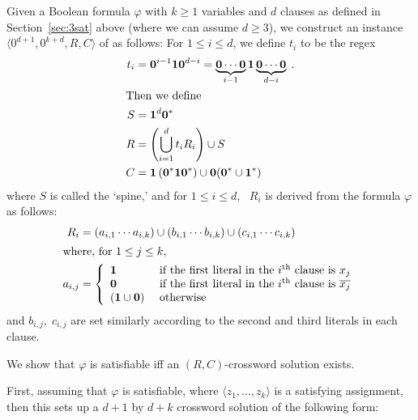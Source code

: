\documentclass{article}
\newcommand{\0}{\mathbf{0}}
\newcommand{\1}{\mathbf{1}}
\newcommand{\2}{\mathbf{2}}
\renewcommand{\p}{\varphi}
\newcommand{\tup}[1]{\langle{} #1 \rangle{}}
\theoremstyle{plain}
\theoremstyle{definition}
\begin{document}
Given a Boolean formula $\p$ with $k\ge 1$ variables and $d$ clauses as defined in Section~\ref{sec:3sat} above (where we can assume $d\ge 3$), we construct an instance $\tup{0^{d+1},0^{k+d},R,C}$ of  as follows: For $1 \le i \le d$, we define $t_i$ to be the regex
\begin{align*}
  t_i & = \0^{i-1}\1\0^{d-i} = \underbrace{\0 \cdots \0}_{i - 1} \1 \underbrace {\0 \cdots \0}_{d - i}\;. \\
  \shortintertext{Then we define}
  S   & = \1^d\0^*                                                                                        \\
  R   & = \left( \displaystyle \bigcup_{i=1}^{d} t_i R_i \right) \cup S                                   \\
  C   & = \1\left(\0^*\1\0^*\right) \cup \0(\0^* \cup \1^*)
\end{align*}
where $S$ is called the `spine,' and for $1\le i\le d$, \ $R_i$ is derived from the formula $\p$ as follows:
\begin{align*}
  R_i                                                  & = (a_{i,1} \cdots a_{i,k}) \cup (b_{i,1} \cdots b_{i,k}) \cup (c_{i,1} \cdots c_{i,k}) \\
  \shortintertext{where, for $1 \le j \le k$,} a_{i,j} & = \left\{
  \begin{array}{ll}
    \1           & \text{ if the first literal in the } i^{\text{th}} \text{ clause is } x_j            \\
    \0           & \text{ if the first literal in the } i^{\text{th}} \text{ clause is } \overline{x_j} \\
    (\1 \cup \0) & \text{ otherwise }
  \end{array}
  \right.
\end{align*}
and $b_{i,j},\;c_{i,j}$ are set similarly according to the second and third literals in each clause.

We show that $\p$ is satisfiable iff an $(R, C)$-crossword solution exists.

First, assuming that $\p$ is satisfiable, where $\tup{z_1, \ldots, z_k}$ is a satisfying assignment, then this sets up a $d+1$ by $d+k$ crossword solution of the following form:
\end{document}
